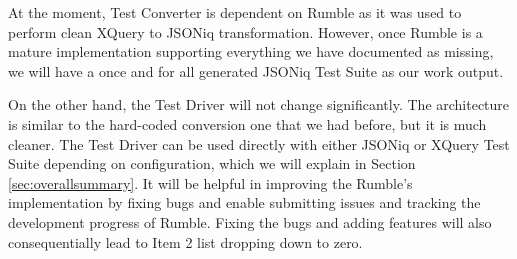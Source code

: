 

At the moment, Test Converter is dependent on Rumble as it was used to perform clean XQuery to JSONiq transformation. However, once Rumble is a mature implementation supporting everything we have documented as missing, we will have a once and for all generated JSONiq Test Suite as our work output. 

On the other hand, the Test Driver will not change significantly. The architecture is similar to the hard-coded conversion one that we had before, but it is much cleaner. The Test Driver can be used directly with either JSONiq or XQuery Test Suite depending on configuration, which we will explain in Section \ref{sec:overallsummary}. It will be helpful in improving the Rumble's implementation by fixing bugs and enable submitting issues and tracking the development progress of Rumble. Fixing the bugs and adding features will also consequentially lead to Item 2 list dropping down to zero. 
